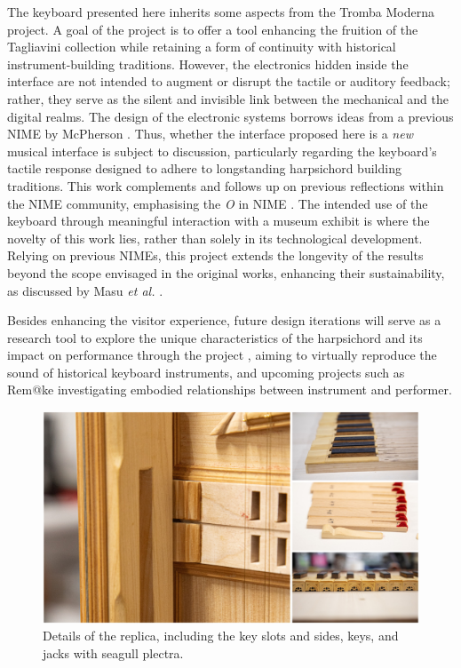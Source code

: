 The keyboard presented here inherits some aspects from the Tromba Moderna project. A goal of the project is to offer a tool enhancing the fruition of the Tagliavini collection while retaining a form of continuity with historical instrument-building traditions. However, the electronics hidden inside the interface are not intended to augment or disrupt the tactile or auditory feedback; rather, they serve as the silent and invisible link between the mechanical and the digital realms. The design of the electronic systems borrows ideas from a previous NIME by McPherson \cite{McPherson2013}. Thus, whether the interface proposed here is a \emph{new} musical interface is subject to discussion, particularly regarding the keyboard's tactile response designed to adhere to longstanding harpsichord building traditions. This work complements and follows up on previous reflections within the NIME community, emphasising the \emph{O} in NIME \cite{Masu_NIME_2023}. The intended use of the keyboard through meaningful interaction with a museum exhibit is where the novelty of this work lies, rather than solely in its technological development. Relying on previous NIMEs, this project extends the longevity of the results beyond the scope envisaged in the original works, enhancing their sustainability, as discussed by Masu \emph{et al.} \cite{Masu_NIME_2023}.

Besides enhancing the visitor experience, future design iterations will serve as a research tool to explore the unique characteristics of the harpsichord and its impact on performance through the  project \cite{NEMUS}, aiming to virtually reproduce the sound of historical keyboard instruments, and upcoming projects such as Rem@ke \cite{remake1} investigating embodied relationships between instrument and performer.

\begin{figure}
\includegraphics[width=\linewidth]{src/images/details.jpg}
\caption{Details of the replica, including the key slots and sides, keys, and jacks with seagull plectra.}\label{fig:details}
\end{figure}

